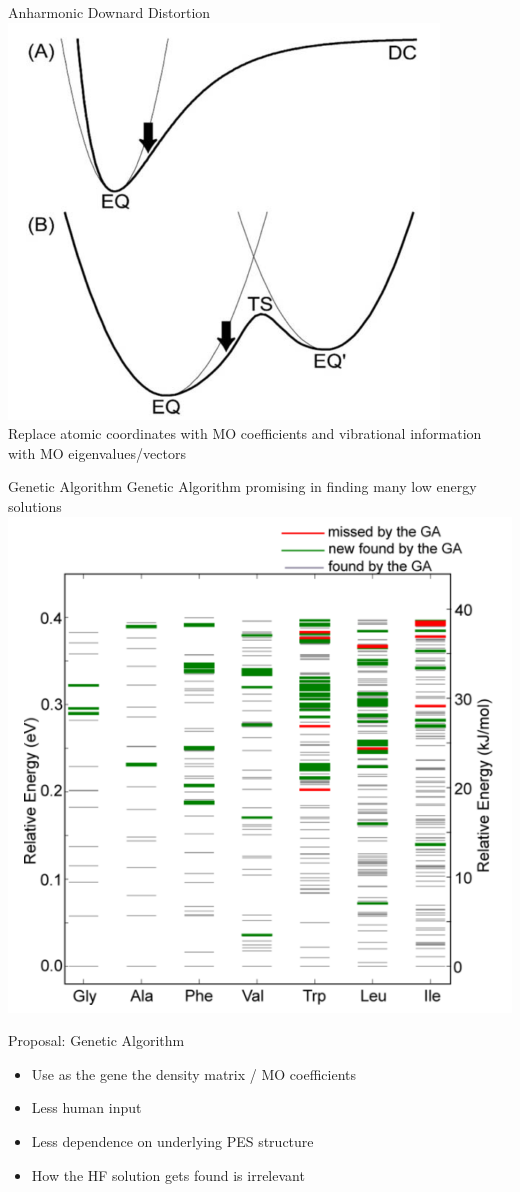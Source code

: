 \documentclass[10pt]{beamer}
\begin{document}
{{{{{{{{{{{{{
\begin{frame}{Anharmonic Downard Distortion}
  \centering
	\includegraphics[width=.6\linewidth]{../figures/ADD.png}\\
	Replace atomic coordinates with MO coefficients and vibrational information with MO 
	eigenvalues/vectors
\end{frame}

\begin{frame}{Genetic Algorithm}
  \centering
  Genetic Algorithm promising in finding many low energy solutions
	\includegraphics[width=.6\linewidth]{../figures/GA_supady.png}
\end{frame}

\begin{frame}{Proposal: Genetic Algorithm}
  \begin{itemize}
    \item{ Use as the gene the density matrix / MO coefficients }
    \item{ Less human input }
    \item{ Less dependence on underlying PES structure }
    \item{ How the HF solution gets found is irrelevant } 
  \end{itemize}
\end{frame}


}}}}}}}}}}}}}
\end{document}
